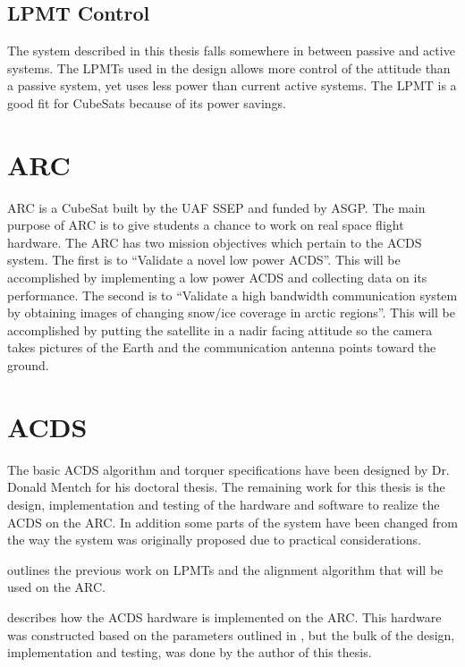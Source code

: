 \subsection{\acl*{LPMT} Control}

The system described in this thesis falls somewhere in between passive and active systems. The \acp{LPMT} used in the design allows more control of the attitude than a passive system, yet uses less power than current active systems. The \ac{LPMT} is a good fit for CubeSats because of its power savings.

\section{\acl*{ARC}}

\ac{ARC} is a CubeSat built by the UAF \ac{SSEP} and funded by \ac{ASGP}. The main purpose of \ac{ARC} is to give students a chance to work on real space flight hardware. The \ac{ARC} has two mission objectives which pertain to the \ac{ACDS} system. The first is to \enquote{Validate a novel low power \ac{ACDS}}\cite{ARCweb}. This will be accomplished by implementing a low power \ac{ACDS} and collecting data on its performance. The second is to \enquote{Validate a high bandwidth communication system by obtaining images of changing snow/ice coverage in arctic regions}\cite{ARCweb}. This will be accomplished by putting the satellite in a nadir facing attitude so the camera takes pictures of the Earth and the communication antenna points toward the ground.

\section{\acl*{ACDS}}

The basic \ac{ACDS} algorithm and torquer specifications have been designed by Dr. Donald Mentch for his doctoral thesis\cite{Mentch11}. The remaining work for this thesis is the design, implementation and testing of the hardware and software to realize the \ac{ACDS} on the \ac{ARC}. In addition some parts of the system have been changed from the way the system was originally proposed due to practical considerations.

 outlines the previous work on \acp{LPMT} and the alignment algorithm that will be used on the \ac{ARC}.

 describes how the \ac{ACDS} hardware is implemented on the \ac{ARC}. This hardware was constructed based on the parameters outlined in \cite{Mentch11}, but the bulk of the design, implementation and testing, was done by the author of this thesis.

